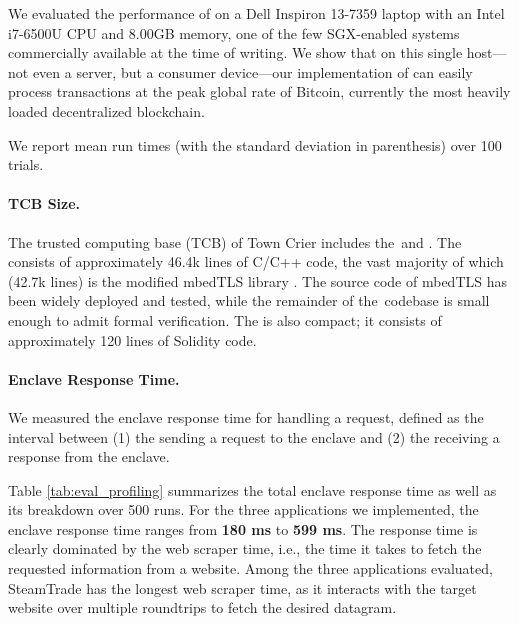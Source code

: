 We evaluated the performance of \tc on a Dell Inspiron 13-7359 laptop 
with an Intel i7-6500U CPU and 8.00GB memory, one of the few SGX-enabled systems commercially available at the
time of writing.
We show that on this single host---not even a server, but a consumer device---our implementation of \tc can easily process
transactions at the peak global rate of Bitcoin, currently the most heavily loaded decentralized blockchain. 

We report mean run times (with the standard deviation in parenthesis) over 100 trials.

\paragraph{TCB Size.}
The trusted computing base (TCB) of Town Crier includes the~\encname and \tcontract. The \encname consists of approximately 46.4k
lines of C/C++ code, the vast majority of which (42.7k lines) is the modified mbedTLS library \cite{mbedtls}.
The source code of mbedTLS has been widely deployed and tested, while the
remainder of the~\encname codebase is small enough to admit formal verification.
The \tcontract is also compact;
it consists of approximately 120 lines of Solidity code.

\paragraph{Enclave Response Time.}
\label{subsec:response time}
We measured the enclave response time for handling a \tc request, defined as the interval between (1)  
the \medname sending a request to the enclave 
and (2) the \medname receiving a response from the enclave. 

Table \ref{tab:eval_profiling} summarizes the total enclave response time as
well as its breakdown over 500 runs.  For the three applications we
implemented, the enclave response time ranges from {\bf 180 ms} to {\bf 599 ms}.
The response time is clearly dominated by the web scraper time, i.e., the time
it takes to fetch the requested information from a website.  Among the three
applications evaluated, {\sf SteamTrade} has the longest web scraper time, as it interacts with the target website
over multiple roundtrips to fetch the desired datagram.


